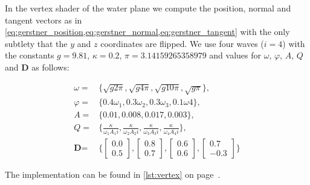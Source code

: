In the vertex shader of the water plane we compute the position, normal and
tangent vectors as in
\cref{eq:gerstner_position,eq:gerstner_normal,eq:gerstner_tangent} with the only
subtlety that the $y$ and $z$ coordinates are flipped. We use four waves ($i =
4$) with the constants $g = 9.81$, $\kappa = 0.2$, $\pi = 3.14159265358979$ and 
values for $\omega$, $\varphi$, $A$, $Q$ and $\textbf{D}$ as follows:

\begin{equation}\label{eq:gerstner_constants}
\begin{split}
    \omega ={}& \Big\{\sqrt{g 2\pi}, \sqrt{g 4\pi}, \sqrt{g 10\pi}, \sqrt{g
    \pi}\Big\},\\
    \varphi ={}& \{0.4 \omega_1, 0.3 \omega_2, 0.3 \omega_3, 0.1 \omega 4\},\\
    A ={}& \{0.01, 0.008, 0.017, 0.003\},\\
    Q ={}& \Bigg\{\frac{\kappa}{\omega_1 A_1 i}, \frac{\kappa}{\omega_2 A_2 i},
    \frac{\kappa}{\omega_3 A_3 i}, \frac{\kappa}{\omega_4 A_4 i} \Bigg\},\\
    \textbf{D} ={}& \Bigg\{\begin{bmatrix}0.0 \\ 0.5\end{bmatrix},
    \begin{bmatrix}0.8 \\ 0.7\end{bmatrix}, \begin{bmatrix}0.6 \\
    0.6\end{bmatrix}, \begin{bmatrix}0.7 \\ -0.3\end{bmatrix}\Bigg\}
\end{split}
\end{equation}

The implementation can be found in \autoref{lst:vertex} on
page~\pageref{lst:vertex}.

